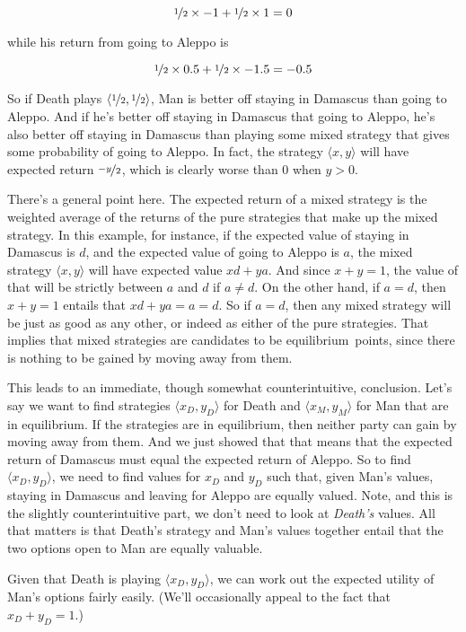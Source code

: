 \documentclass[11pt,]{article}
\begin{document}
\[
\nicefrac{1}{2} \times -1 + \nicefrac{1}{2} \times 1 = 0
\]

while his return from going to Aleppo is

\[
\nicefrac{1}{2} \times 0.5 + \nicefrac{1}{2} \times -1.5 = -0.5
\]

So if Death plays \(\langle \nicefrac{1}{2}, \nicefrac{1}{2} \rangle\),
Man is better off staying in Damascus than going to Aleppo. And if he's
better off staying in Damascus that going to Aleppo, he's also better
off staying in Damascus than playing some mixed strategy that gives some
probability of going to Aleppo. In fact, the strategy
\(\langle x, y \rangle\) will have expected return \(\nicefrac{-y}{2}\),
which is clearly worse than 0 when \(y > 0\).

There's a general point here. The expected return of a mixed strategy is
the weighted average of the returns of the pure strategies that make up
the mixed strategy. In this example, for instance, if the expected value
of staying in Damascus is \(d\), and the expected value of going to
Aleppo is \(a\), the mixed strategy \(\langle x, y \rangle\) will have
expected value \(xd + ya\). And since \(x + y = 1\), the value of that
will be strictly between \(a\) and \(d\) if \(a \neq d\). On the other
hand, if \(a = d\), then \(x + y = 1\) entails that \(xd + ya = a = d\).
So if \(a = d\), then any mixed strategy will be just as good as any
other, or indeed as either of the pure strategies. That implies that
mixed strategies are candidates to be equilibrium~points, since there is
nothing to be gained by moving away from them.

This leads to an immediate, though somewhat counterintuitive,
conclusion. Let's say we want to find strategies
\(\langle x_D, y_D \rangle\) for Death and \(\langle x_M, y_M \rangle\)
for Man that are in equilibrium. If the strategies are in equilibrium,
then neither party can gain by moving away from them. And we just showed
that that means that the expected return of Damascus must equal the
expected return of Aleppo. So to find \(\langle x_D, y_D \rangle\), we
need to find values for \(x_D\) and \(y_D\) such that, given Man's
values, staying in Damascus and leaving for Aleppo are equally valued.
Note, and this is the slightly counterintuitive part, we don't need to
look at \textit{Death's} values. All that matters is that Death's
strategy and Man's values together entail that the two options open to
Man are equally valuable.

Given that Death is playing \(\langle x_D, y_D \rangle\), we can work
out the expected utility of Man's options fairly easily. (We'll
occasionally appeal to the fact that \(x_D + y_D = 1\).)
\end{document}
